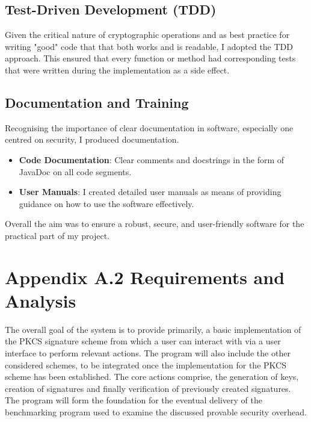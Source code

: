 \documentclass[]{final_report}
\theoremstyle{definition}
\begin{document}
\subsection{Test-Driven Development (TDD)}
Given the critical nature of cryptographic operations and as best practice for writing "good" code that that both works and is readable, I adopted the TDD approach. This ensured that every function or method had corresponding tests that were written during the implementation as a side effect. 
\subsection{Documentation and Training}
Recognising the importance of clear documentation in software, especially one centred on security, I produced documentation.

\begin{itemize}
    \item \textbf{Code Documentation}: Clear comments and docstrings in the form of JavaDoc on all code segments.
    \item \textbf{User Manuals}: I created detailed user manuals as means of providing guidance on how to use the software effectively.
\end{itemize}

Overall the aim was to ensure a robust, secure, and user-friendly software for the practical part of my project.

\section{Appendix A.2 Requirements and Analysis}
The overall goal of the system is to provide primarily, a basic implementation of the PKCS signature scheme from which a user can interact with via a user interface to perform relevant actions. The program will also include the other considered schemes, to be integrated once the implementation for the PKCS scheme has been established.
The core actions comprise, the generation of keys, creation of signatures and finally verification of previously created signatures. 
The program will form the foundation for the eventual delivery of the benchmarking program used to examine the discussed provable security overhead.
\end{document}
